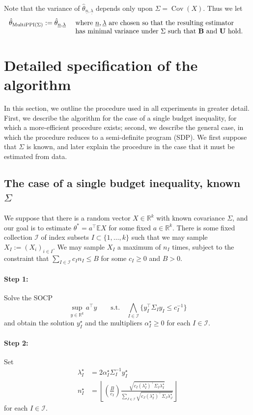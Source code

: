 \documentclass{article} %
\newcommand{\R}{\mathbb{R}}
\newcommand{\Ex}{\mathbb{E}}
\DeclareMathOperator{\Cov}{Cov}
\begin{document}
Note that the variance of $\hat{\theta}_{\underline{n},\underline{\lambda}}$ depends only upon $\Sigma=\Cov(X)$. Thus we let
\[
\hat{\theta}_{\text{MultiPPI}(\Sigma)} := \hat{\theta}_{\underline{n},\underline{\lambda}}
\quad\begin{array}[t]{@{}l}
\text{ where $\underline{n},\underline{\lambda}$ are chosen so that the resulting estimator} \\ 
\text{ has minimal variance under $\Sigma$ such that $\mathbf{B}$ and $\mathbf{U}$ hold.} 
\end{array}
\]
\section{Detailed specification of the algorithm}\label{sec:algorithm}

In this section, we outline the procedure used in all experiments in greater detail. First, we describe the algorithm for the case of a single budget inequality, for which a more-efficient procedure exists; second, we describe the general case, in which the procedure reduces to a semi-definite program (SDP).
We first suppose that $\Sigma$ is known, and later explain the procedure in the case that it must be estimated from data.

\subsection{The case of a single budget inequality, known $\Sigma$}
We suppose that there is a random vector $X\in\R^k$ with known covariance $\Sigma$, and our goal is to estimate $\theta^*=a^\top \Ex X$ for some fixed $a\in\R^k$. There is some fixed collection $\mathcal{I}$ of index subsets $I\subset\{1,\dots,k\}$ such that we may sample $X_I:=(X_i)_{i\in I}$. We may sample $X_I$ a maximum of $n_I$ times, subject to the constraint that $\sum_{I\in\mathcal{I}} c_In_I\leq B$ for some $c_I\geq0$ and $B>0$.

\paragraph{Step 1:} Solve the SOCP
\[
\sup_{y\in \R^k} a^\top y \quad\quad\text{s.t.}\quad \bigwedge_{I\in\mathcal{I}} \big\{y_I^\top {\Sigma_I} y_I\leq c_I^{-1}\big\}
\]
and obtain the solution $y_I^\star$ and the multipliers $\alpha^\star_I\geq0$ for each $I\in\mathcal{I}$.

\paragraph{Step 2:} Set
\begin{align*}
    \lambda^\star_I &= 2\alpha^\star_I \Sigma_I^{-1} y_I^\star \\
    n^\star_I &= \left\lfloor \left(\frac{B}{c_I}\right) \frac{\sqrt{c_I (\lambda^\star_I)^\top \Sigma_I \lambda^\star_I}}{\sum_{J\in\mathcal{I}}\sqrt{c_J (\lambda^\star_I)^\top \Sigma_J \lambda^\star_J} }\right\rfloor
\end{align*}
for each $I\in\mathcal{I}$.
\end{document}
